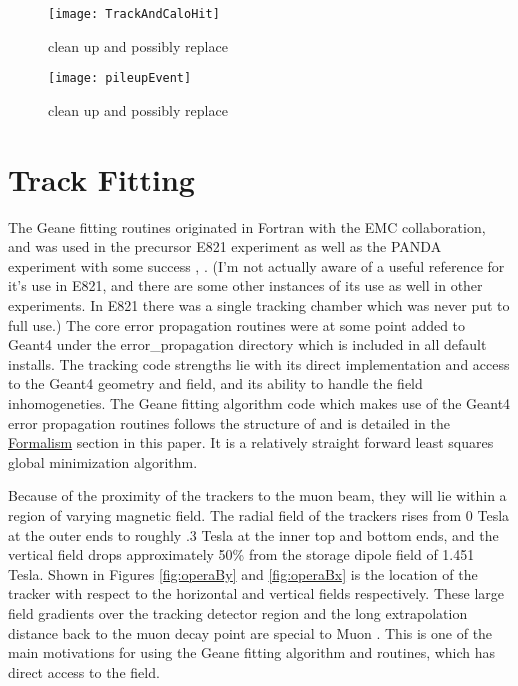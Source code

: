 \begin{figure}[]
    \label{fig:TrackAndCaloHit}
	\centering
	\texttt{[image: TrackAndCaloHit]}
    \caption[TrackAndCaloHit]{clean up and possibly replace}    
\end{figure}

\begin{figure}[]
    \label{fig:pileupEvent}
	\centering
	\texttt{[image: pileupEvent]}
    \caption[pileupEvent]{clean up and possibly replace}    
\end{figure}




\section{Track Fitting}
\label{sec:Track Fitting}

The Geane fitting routines originated in Fortran with the EMC collaboration, and was used in the precursor E821 experiment as well as the PANDA experiment with some success \cite{geanemanual}, \cite{Lavezzi}. (I'm not actually aware of a useful reference for it's use in E821, and there are some other instances of its use as well in other experiments. In E821 there was a single tracking chamber which was never put to full use.) The core error propagation routines were at some point added to Geant4 under the error\_propagation directory which is included in all default installs. The tracking code strengths lie with its direct implementation and access to the Geant4 geometry and field, and its ability to handle the field inhomogeneties. The Geane fitting algorithm code which makes use of the Geant4 error propagation routines follows the structure of \cite{geanemanual} and is detailed in the \hyperref[sec:Formalism]{Formalism} section in this paper. It is a relatively straight forward least squares global \chisq minimization algorithm. 


Because of the proximity of the trackers to the muon beam, they will lie within a region of varying magnetic field. The radial field of the trackers rises from 0 Tesla at the outer ends to roughly .3 Tesla at the inner top and bottom ends, and the vertical field drops approximately 50\% from the storage dipole field of 1.451 Tesla. Shown in Figures \ref{fig:operaBy} and \ref{fig:operaBx} is the location of the tracker with respect to the horizontal and vertical fields respectively. These large field gradients over the tracking detector region and the long extrapolation distance back to the muon decay point are special to Muon \gmtwo. This is one of the main motivations for using the Geane fitting algorithm and routines, which has direct access to the field.

